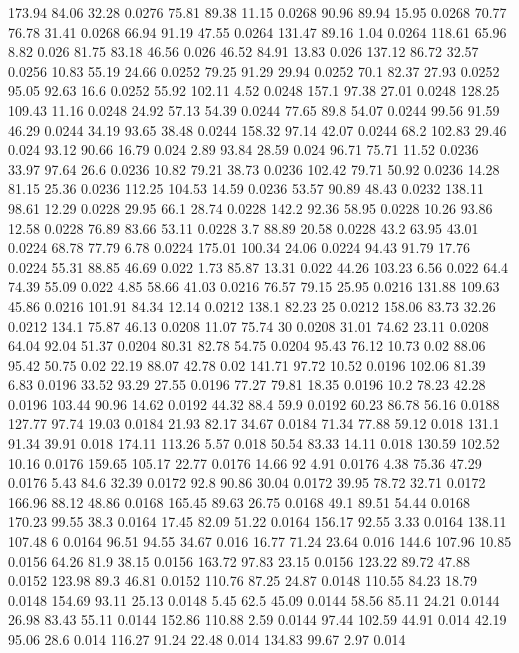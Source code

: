 173.94	84.06	32.28	0.0276
75.81	89.38	11.15	0.0268
90.96	89.94	15.95	0.0268
70.77	76.78	31.41	0.0268
66.94	91.19	47.55	0.0264
131.47	89.16	1.04	0.0264
118.61	65.96	8.82	0.026
81.75	83.18	46.56	0.026
46.52	84.91	13.83	0.026
137.12	86.72	32.57	0.0256
10.83	55.19	24.66	0.0252
79.25	91.29	29.94	0.0252
70.1	82.37	27.93	0.0252
95.05	92.63	16.6	0.0252
55.92	102.11	4.52	0.0248
157.1	97.38	27.01	0.0248
128.25	109.43	11.16	0.0248
24.92	57.13	54.39	0.0244
77.65	89.8	54.07	0.0244
99.56	91.59	46.29	0.0244
34.19	93.65	38.48	0.0244
158.32	97.14	42.07	0.0244
68.2	102.83	29.46	0.024
93.12	90.66	16.79	0.024
2.89	93.84	28.59	0.024
96.71	75.71	11.52	0.0236
33.97	97.64	26.6	0.0236
10.82	79.21	38.73	0.0236
102.42	79.71	50.92	0.0236
14.28	81.15	25.36	0.0236
112.25	104.53	14.59	0.0236
53.57	90.89	48.43	0.0232
138.11	98.61	12.29	0.0228
29.95	66.1	28.74	0.0228
142.2	92.36	58.95	0.0228
10.26	93.86	12.58	0.0228
76.89	83.66	53.11	0.0228
3.7	88.89	20.58	0.0228
43.2	63.95	43.01	0.0224
68.78	77.79	6.78	0.0224
175.01	100.34	24.06	0.0224
94.43	91.79	17.76	0.0224
55.31	88.85	46.69	0.022
1.73	85.87	13.31	0.022
44.26	103.23	6.56	0.022
64.4	74.39	55.09	0.022
4.85	58.66	41.03	0.0216
76.57	79.15	25.95	0.0216
131.88	109.63	45.86	0.0216
101.91	84.34	12.14	0.0212
138.1	82.23	25	0.0212
158.06	83.73	32.26	0.0212
134.1	75.87	46.13	0.0208
11.07	75.74	30	0.0208
31.01	74.62	23.11	0.0208
64.04	92.04	51.37	0.0204
80.31	82.78	54.75	0.0204
95.43	76.12	10.73	0.02
88.06	95.42	50.75	0.02
22.19	88.07	42.78	0.02
141.71	97.72	10.52	0.0196
102.06	81.39	6.83	0.0196
33.52	93.29	27.55	0.0196
77.27	79.81	18.35	0.0196
10.2	78.23	42.28	0.0196
103.44	90.96	14.62	0.0192
44.32	88.4	59.9	0.0192
60.23	86.78	56.16	0.0188
127.77	97.74	19.03	0.0184
21.93	82.17	34.67	0.0184
71.34	77.88	59.12	0.018
131.1	91.34	39.91	0.018
174.11	113.26	5.57	0.018
50.54	83.33	14.11	0.018
130.59	102.52	10.16	0.0176
159.65	105.17	22.77	0.0176
14.66	92	4.91	0.0176
4.38	75.36	47.29	0.0176
5.43	84.6	32.39	0.0172
92.8	90.86	30.04	0.0172
39.95	78.72	32.71	0.0172
166.96	88.12	48.86	0.0168
165.45	89.63	26.75	0.0168
49.1	89.51	54.44	0.0168
170.23	99.55	38.3	0.0164
17.45	82.09	51.22	0.0164
156.17	92.55	3.33	0.0164
138.11	107.48	6	0.0164
96.51	94.55	34.67	0.016
16.77	71.24	23.64	0.016
144.6	107.96	10.85	0.0156
64.26	81.9	38.15	0.0156
163.72	97.83	23.15	0.0156
123.22	89.72	47.88	0.0152
123.98	89.3	46.81	0.0152
110.76	87.25	24.87	0.0148
110.55	84.23	18.79	0.0148
154.69	93.11	25.13	0.0148
5.45	62.5	45.09	0.0144
58.56	85.11	24.21	0.0144
26.98	83.43	55.11	0.0144
152.86	110.88	2.59	0.0144
97.44	102.59	44.91	0.014
42.19	95.06	28.6	0.014
116.27	91.24	22.48	0.014
134.83	99.67	2.97	0.014
